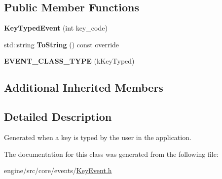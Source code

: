 \subsection*{Public Member Functions}
\begin{DoxyCompactItemize}
\item 
\mbox{\label{classengine_1_1events_1_1KeyTypedEvent_a8e73360c78c5abefc838c7cbea09213f}} 
{\bfseries Key\+Typed\+Event} (int key\+\_\+code)
\item 
\mbox{\label{classengine_1_1events_1_1KeyTypedEvent_af805e57bdf4ae3df824a73d1465a603e}} 
std\+::string {\bfseries To\+String} () const override
\item 
\mbox{\label{classengine_1_1events_1_1KeyTypedEvent_a1973d84e5946e3c52a293b5faf128409}} 
{\bfseries E\+V\+E\+N\+T\+\_\+\+C\+L\+A\+S\+S\+\_\+\+T\+Y\+PE} (k\+Key\+Typed)
\end{DoxyCompactItemize}
\subsection*{Additional Inherited Members}


\subsection{Detailed Description}
Generated when a key is typed by the user in the application. 

The documentation for this class was generated from the following file\+:\begin{DoxyCompactItemize}
\item 
engine/src/core/events/\hyperlink{KeyEvent_8h}{Key\+Event.\+h}\end{DoxyCompactItemize}
